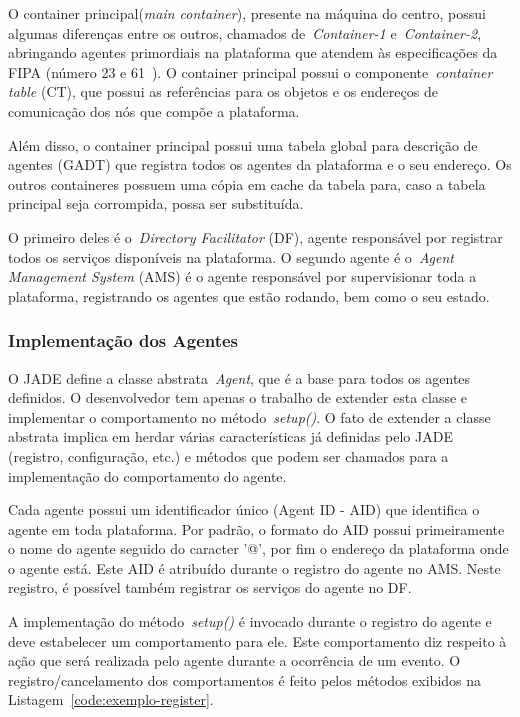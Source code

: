 O container principal(\emph{main container}), presente na máquina do centro, possui algumas diferenças entre os outros, chamados de~\emph{Container-1} e~\emph{Container-2}, abringando agentes primordiais na plataforma que atendem às especificações da FIPA (número 23 e 61~\cite{bellifemineGuide02}). O container principal possui o componente~\emph{container table} (CT), que possui as referências para os objetos e os endereços de comunicação dos nós que compõe a plataforma.

Além disso, o container principal possui uma tabela global para descrição de agentes (GADT) que registra todos os agentes da plataforma e o seu endereço. Os outros containeres possuem uma cópia em cache da tabela para, caso a tabela principal seja corrompida, possa ser substituída.

O primeiro deles é o~\emph{Directory Facilitator} (DF), agente responsável por registrar todos os serviços disponíveis na plataforma. O segundo agente é o~\emph{Agent Management System} (AMS) é o agente responsável por supervisionar toda a plataforma, registrando os agentes que estão rodando, bem como o seu estado. 

\subsubsection{Implementação dos Agentes}
O JADE define a classe abstrata~\emph{Agent}, que é a base para todos os agentes definidos. O desenvolvedor tem apenas o trabalho de extender esta classe e implementar o comportamento no método~\emph{setup()}. O fato de extender a classe abstrata implica em herdar várias características já definidas pelo JADE (registro, configuração, etc.) e métodos que podem ser chamados para a implementação do comportamento do agente.

Cada agente possui um identificador único (Agent ID - AID) que identifica o agente em toda plataforma. Por padrão, o formato do AID possui primeiramente o nome do agente seguido do caracter '@', por fim o endereço da plataforma onde o agente está. Este AID é atribuído durante o registro do agente no AMS. Neste registro, é possível também registrar os serviços do agente no DF.

A implementação do método~\emph{setup()} é invocado durante o registro do agente e deve estabelecer um comportamento para ele. Este comportamento diz respeito à ação que será realizada pelo agente durante a ocorrência de um evento. O registro/cancelamento dos comportamentos é feito pelos métodos exibidos na Listagem~\ref{code:exemplo-register}.

